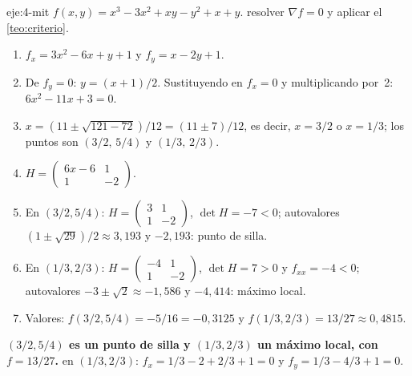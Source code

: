 \begin{solucion}{eje:4-mit}
\datos $f(x,y)=x^{3}-3x^{2}+xy-y^{2}+x+y$.
\planteamiento resolver $\nabla f=0$ y aplicar el \cref{teo:criterio}.
\pasos
\begin{enumerate}[label=\arabic*.]
  \item $f_x=3x^{2}-6x+y+1$ y $f_y=x-2y+1$.
  \item De $f_y=0$: $y=(x+1)/2$. Sustituyendo en $f_x=0$ y multiplicando por~2: $6x^{2}-11x+3=0$.
  \item $x=(11\pm\sqrt{121-72})/12=(11\pm 7)/12$, es decir, $x=3/2$ o $x=1/3$; los puntos son $(3/2,\,5/4)$ y $(1/3,\,2/3)$.
  \item $H=\begin{pmatrix}6x-6&1\\1&-2\end{pmatrix}$.
  \item En $(3/2,5/4)$: $H=\begin{pmatrix}3&1\\1&-2\end{pmatrix}$, $\det H=-7<0$; autovalores $(1\pm\sqrt{29})/2\approx 3{,}193$ y $-2{,}193$: punto de silla.
  \item En $(1/3,2/3)$: $H=\begin{pmatrix}-4&1\\1&-2\end{pmatrix}$, $\det H=7>0$ y $f_{xx}=-4<0$; autovalores $-3\pm\sqrt2\approx-1{,}586$ y $-4{,}414$: máximo local.
  \item Valores: $f(3/2,5/4)=-5/16=-0{,}3125$ y $f(1/3,2/3)=13/27\approx 0{,}4815$.
\end{enumerate}
\resultado \textbf{$(3/2,5/4)$ es un punto de silla y $(1/3,2/3)$ un máximo local, con $f=13/27$.}
\comprobacion en $(1/3,2/3)$: $f_x=1/3-2+2/3+1=0$ y $f_y=1/3-4/3+1=0$.
\end{solucion}

